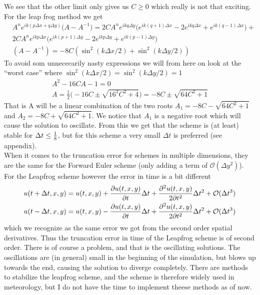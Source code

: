 \documentclass[a4paper,english, 10pt, twoside]{article}
\renewcommand{\d}{\partial}
\begin{document}
We see that the other limit only gives us $C\geq 0$ which really is not that exciting. \\
For the leap frog method we get
\begin{align*}
  &A^ne^{ik(p\Delta x +q\Delta y)}\big(A-A^{-1}\big) = 2CA^ne^{ikq\Delta y}\big(e^{ik(q+1)\Delta x} -2e^{ikq\Delta x}+
  e^{ik(q-1)\Delta x}\big)+\\
 &2CA^ne^{ikp\Delta x}\big(e^{ik(p+1)\Delta y} -2e^{ikp\Delta y} +e^{ik(p-1)\Delta y}\big) \\
 &(A-A^{-1}) = -8C(\sin^2(k\Delta x/2)+ \sin^2(k\Delta y/2))
\end{align*}
To avoid som unnececarily nasty expressions we will from here on look at the ``worst case'' where $\sin^2(k\Delta x/2) = 
\sin^2(k\Delta y/2) = 1$
\begin{align}
\nonumber A^2 -16CA -1 = 0\\
 A = \frac{1}{2}\big(-16C \pm\sqrt{16^2C^2 +4}\big)  = -8C \pm\sqrt{64C^2+1}\label{LF_end}
\end{align}
That is A will be a linear combination of the two roots $A_1 = -8C -\sqrt{64C^2+1}$ and $A_2 = -8C +\sqrt{64C^2+1}$.
We notice that $A_1$ is a negative root which will cause the solution to oscillate. From this we get that the scheme is (at least) stable for 
$\Delta t \leq {1\over8}$, but for this scheme a very small $\Delta t$ is preferred (see appendix).\\

When it comes to the truncation error for schemes in multiple dimensions, they are the same for the Forward Euler scheme (only adding a term of
$\mathcal{O}(\Delta y^2)$). For the Leapfrog scheme however the error in time is a bit different
\begin{align*}
 u(t+\Delta t,x,y) = u(t,x,y) + {\d u(t,x,y)\over \d t}\Delta t + {\d^2u(t,x,y)\over2\d t^2}\Delta t^2 +\mathcal{O}(\Delta t^3)\\
 u(t-\Delta t,x,y) = u(t,x,y) - {\d u(t,x,y)\over \d t}\Delta t + {\d^2u(t,x,y)\over2\d t^2}\Delta t^2 +\mathcal{O}(\Delta t^3)
\end{align*}
which we recognize as the same error we got from the second order spatial derivatives. Thus the truncation error in time of the Leapfrog scheme is of 
second order. There is of course a problem, and that is the oscillating solutions. The oscillations are (in general) small in the beginning of the 
simulation, but blows up towards the end, causing the solution to diverge completely. There are methods to stabilize the leapfrog scheme, and 
the scheme is therefore widely used in meteorology, but I do not have the time to implement theese methods as of now. 
\end{document}

